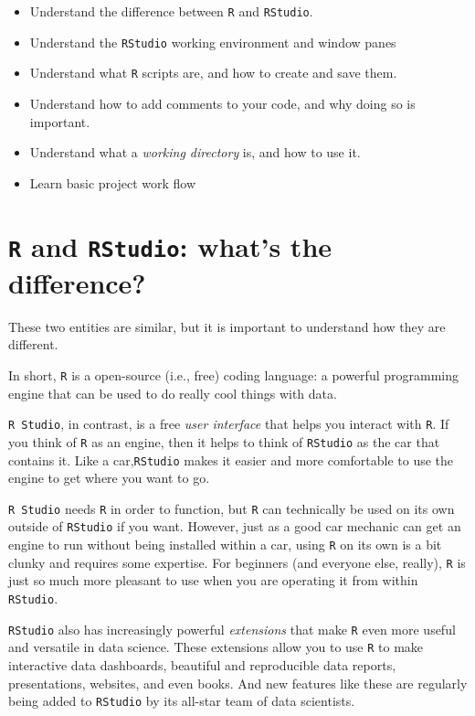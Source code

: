 \documentclass[
]{book}
\providecommand{\tightlist}{%
  \setlength{\itemsep}{0pt}\setlength{\parskip}{0pt}}
\begin{document}
\begin{itemize}
\tightlist
\item
  Understand the difference between \texttt{R} and \texttt{RStudio}.
\item
  Understand the \texttt{RStudio} working environment and window panes\\
\item
  Understand what \texttt{R} scripts are, and how to create and save them.
\item
  Understand how to add comments to your code, and why doing so is important.
\item
  Understand what a \emph{working directory} is, and how to use it.
\item
  Learn basic project work flow
\end{itemize}

\hypertarget{r-and-rstudio-whats-the-difference}{%
\section*{\texorpdfstring{\texttt{R} and \texttt{RStudio}: what's the difference?}{R and RStudio: what's the difference?}}\label{r-and-rstudio-whats-the-difference}}

These two entities are similar, but it is important to understand how they are different.

In short, \texttt{R} is a open-source (i.e., free) coding language: a powerful programming engine that can be used to do really cool things with data.

\texttt{R\ Studio}, in contrast, is a free \emph{user interface} that helps you interact with \texttt{R}. If you think of \texttt{R} as an engine, then it helps to think of \texttt{RStudio} as the car that contains it. Like a car,\texttt{RStudio} makes it easier and more comfortable to use the engine to get where you want to go.

\texttt{R\ Studio} needs \texttt{R} in order to function, but \texttt{R} can technically be used on its own outside of \texttt{RStudio} if you want. However, just as a good car mechanic can get an engine to run without being installed within a car, using \texttt{R} on its own is a bit clunky and requires some expertise. For beginners (and everyone else, really), \texttt{R} is just so much more pleasant to use when you are operating it from within \texttt{RStudio}.

\texttt{RStudio} also has increasingly powerful \emph{extensions} that make \texttt{R} even more useful and versatile in data science. These extensions allow you to use \texttt{R} to make interactive data dashboards, beautiful and reproducible data reports, presentations, websites, and even books. And new features like these are regularly being added to \texttt{RStudio} by its all-star team of data scientists.
\end{document}
